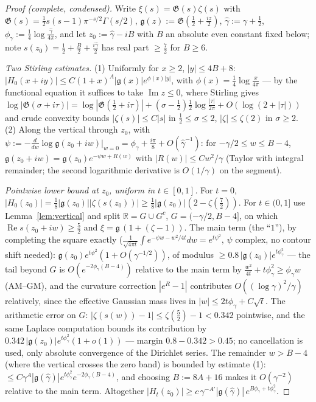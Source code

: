 \documentclass[11pt]{amsart}
\theoremstyle{plain}
\theoremstyle{definition}
\theoremstyle{remark}
\renewcommand{\Re}{\operatorname{Re}}
\newcommand{\Imm}{\operatorname{Im}}
\begin{document}
\begin{proof}[Proof \textup{(}complete, condensed\textup{)}]
Write $\xi(s)=\mathfrak G(s)\zeta(s)$ with $\mathfrak G(s)=\tfrac12s(s-1)\pi^{-s/2}\Gamma(s/2)$, $\mathfrak g(z):=\mathfrak G(\tfrac12+\tfrac{iz}2)$, $\hat\gamma:=\gamma+\tfrac12$, $\phi_\gamma:=\tfrac14\log\frac{\hat\gamma}{4\pi}$, and let $z_0:=\hat\gamma-iB$ with $B$ an absolute even constant fixed below; note $s(z_0)=\tfrac12+\tfrac B2+\tfrac{i\hat\gamma}2$ has real part $\ge\tfrac72$ for $B\ge6$.

\emph{Two Stirling estimates.} (1) Uniformly for $x\ge2$, $|y|\le4B+8$: $|H_0(x+iy)|\le C(1+x)^A|\mathfrak g(x)|e^{\phi(x)|y|}$, with $\phi(x)=\tfrac14\log\frac x{4\pi}$ --- by the functional equation it suffices to take $\Imm z\le0$, where Stirling gives $\log|\mathfrak G(\sigma+i\tau)|=\log|\mathfrak G(\tfrac12+i\tau)|+(\sigma-\tfrac12)\tfrac12\log\frac{|\tau|}{2\pi}+O(\log(2+|\tau|))$ and crude convexity bounds $|\zeta(s)|\le C|s|$ in $\tfrac12\le\sigma\le2$, $|\zeta|\le\zeta(2)$ in $\sigma\ge2$. (2) Along the vertical through $z_0$, with $\psi:=-\frac d{dw}\log\mathfrak g(z_0+iw)|_{w=0}=\phi_\gamma+\tfrac{i\pi}8+O(\hat\gamma^{-1})$: for $-\gamma/2\le w\le B-4$, $\mathfrak g(z_0+iw)=\mathfrak g(z_0)e^{-\psi w+R(w)}$ with $|R(w)|\le Cw^2/\gamma$ (Taylor with integral remainder; the second logarithmic derivative is $O(1/\gamma)$ on the segment).

\emph{Pointwise lower bound at $z_0$, uniform in $t\in[0,1]$.} For $t=0$, $|H_0(z_0)|=\tfrac18|\mathfrak g(z_0)||\zeta(s(z_0))|\ge\tfrac18|\mathfrak g(z_0)|(2-\zeta(\tfrac72))$. For $t\in(0,1]$ use Lemma~\ref{lem:vertical} and split $\mathbb R=G\cup G^c$, $G=(-\gamma/2,B-4]$, on which $\Re s(z_0+iw)\ge\tfrac52$ and $\xi=\mathfrak g\,(1+(\zeta-1))$. The main term (the ``$1$''), by completing the square exactly ($\frac1{\sqrt{4\pi t}}\int e^{-\psi w-w^2/4t}dw=e^{t\psi^2}$, $\psi$ complex, no contour shift needed): $\mathfrak g(z_0)e^{t\psi^2}(1+O(\gamma^{-1/2}))$, of modulus $\ge0.8\,|\mathfrak g(z_0)|e^{t\phi_\gamma^2}$ --- the tail beyond $G$ is $O(e^{-2\phi_\gamma(B-4)})$ relative to the main term by $\frac{w^2}{4t}+t\phi_\gamma^2\ge\phi_\gamma w$ (AM--GM), and the curvature correction $|e^R-1|$ contributes $O((\log\gamma)^2/\gamma)$ relatively, since the effective Gaussian mass lives in $|w|\le2t\phi_\gamma+C\sqrt t$. The arithmetic error on $G$: $|\zeta(s(w))-1|\le\zeta(\tfrac52)-1<0.342$ pointwise, and the same Laplace computation bounds its contribution by $0.342\,|\mathfrak g(z_0)|e^{t\phi_\gamma^2}(1+o(1))$ --- margin $0.8-0.342>0.45$; no cancellation is used, only absolute convergence of the Dirichlet series. The remainder $w>B-4$ (where the vertical crosses the zero band) is bounded by estimate (1): $\le C\gamma^{A}|\mathfrak g(\hat\gamma)|e^{t\phi_\gamma^2}e^{-2\phi_\gamma(B-4)}$, and choosing $B:=8A+16$ makes it $O(\gamma^{-2})$ relative to the main term. Altogether $|H_t(z_0)|\ge c\,\gamma^{-A'}|\mathfrak g(\hat\gamma)|\,e^{B\phi_\gamma+t\phi_\gamma^2}$.


\end{proof}
\end{document}
